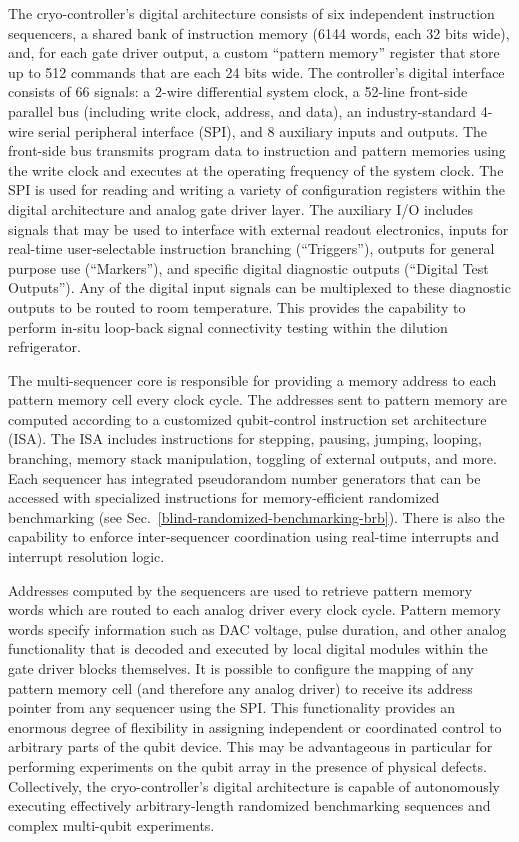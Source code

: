 \documentclass[aps,prl,twocolumn,superscriptaddress,nobibnotes,10pt,floatfix]{revtex4-2}
\newcommand{\secref}[1]{Sec.~\ref{#1}}
\begin{document}
The cryo-controller's digital architecture consists of six independent instruction sequencers, a shared bank of instruction memory (6144 words, each 32 bits wide), and, for each gate driver output, a custom ``pattern memory'' register that store up to 512 commands that are each 24 bits wide.
The controller's digital interface consists of 66 signals: a 2-wire differential system clock, a 52-line front-side parallel bus (including write clock, address, and data), an industry-standard 4-wire serial peripheral interface (SPI), and 8 auxiliary inputs and outputs.
The front-side bus transmits program data to instruction and pattern memories using the write clock and executes at the operating frequency of the system clock.
The SPI is used for reading and writing a variety of configuration registers within the digital architecture and analog gate driver layer.
The auxiliary I/O includes signals that may be used to interface with external readout electronics, inputs for real-time user-selectable instruction branching (``Triggers''), outputs for general purpose use (``Markers''), and specific digital diagnostic outputs (``Digital Test Outputs'').
Any of the digital input signals can be multiplexed to these diagnostic outputs to be routed to room temperature.
This provides the capability to perform in-situ loop-back signal connectivity testing within the dilution refrigerator.

The multi-sequencer core is responsible for providing a memory address to each pattern memory cell every clock cycle.
The addresses sent to pattern memory are computed according to a customized qubit-control instruction set architecture (ISA).
The ISA includes instructions for stepping, pausing, jumping, looping, branching, memory stack manipulation, toggling of external outputs, and more.
Each sequencer has integrated pseudorandom number generators that can be accessed with specialized instructions for memory-efficient randomized benchmarking (see \secref{blind-randomized-benchmarking-brb}).
There is also the capability to enforce inter-sequencer coordination using real-time interrupts and interrupt resolution logic.

Addresses computed by the sequencers are used to retrieve pattern memory words which are routed to each analog driver every clock cycle.
Pattern memory words specify information such as DAC voltage, pulse duration, and other analog functionality that is decoded and executed by local digital modules within the gate driver blocks themselves.
It is possible to configure the mapping of any pattern memory cell (and therefore any analog driver) to receive its address pointer from any sequencer using the SPI.
This functionality provides an enormous degree of flexibility in assigning independent or coordinated control to arbitrary parts of the qubit device.
This may be advantageous in particular for performing experiments on the qubit array in the presence of physical defects.
Collectively, the cryo-controller's digital architecture is capable of autonomously executing effectively arbitrary-length randomized benchmarking sequences and complex multi-qubit experiments.
\end{document}
